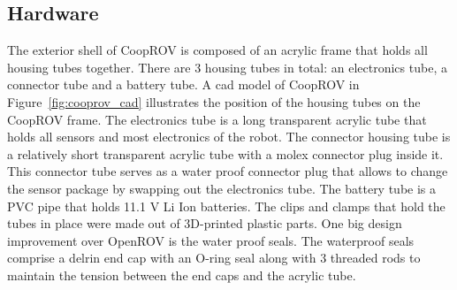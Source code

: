 \documentclass {udthesis}
\begin{document}
\subsection{Hardware}

The exterior shell of CoopROV is composed of an acrylic frame that holds all housing tubes together. There are 3 housing tubes in total: an electronics tube, a connector tube and a battery tube. A \gls{cad} model of CoopROV in Figure~\ref{fig:cooprov_cad} illustrates the position of the housing tubes on the CoopROV frame. The electronics tube is a long transparent acrylic tube that holds all sensors and most electronics of the robot. The connector housing tube is a relatively short transparent acrylic tube with a molex connector plug inside it. This connector tube serves as a water proof connector plug that allows to change the sensor package by swapping out the electronics tube. The battery tube is a PVC pipe that holds 11.1 V Li Ion batteries. The clips and clamps that hold the tubes in place were made out of 3D-printed plastic parts. One big design improvement over OpenROV is the water proof seals. The waterproof seals comprise a delrin end cap with an O-ring seal along with 3 threaded rods to maintain 
the tension between the end caps and the acrylic tube. 
%
\end{document}
